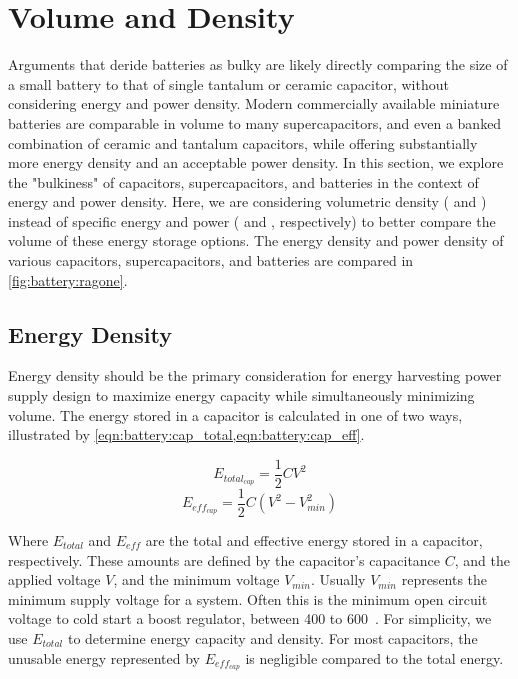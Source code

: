 \section{Volume and Density}
\label{sec:battery:density}
Arguments that deride batteries as bulky are likely directly comparing the size of a small battery to that of single tantalum or ceramic capacitor, without considering energy and power density. Modern commercially available miniature batteries are comparable in volume to many supercapacitors, and even a banked combination of ceramic and tantalum capacitors, while offering substantially more energy density and an acceptable power density. In this section, we explore the "bulkiness" of capacitors, supercapacitors, and batteries in the context of energy and power density. Here, we are considering volumetric density (\ssi[per-mode=symbol]{\Wh\per\liter}  and  \ssi[per-mode=symbol]{\watt\per\liter}) instead of specific energy and power (\ssi[per-mode=symbol]{\Wh\per\kilo\gram} and  \ssi[per-mode=symbol]{\watt\per\kilo\gram}, respectively) to better compare the volume of these energy storage options. The energy density and power density of various capacitors, supercapacitors, and batteries are compared in \cref{fig:battery:ragone}.


\subsection{Energy Density}
Energy density should be the primary consideration for energy harvesting power supply design to maximize energy capacity while simultaneously minimizing volume. 
The energy stored in a capacitor is calculated in one of two ways, illustrated by \cref{eqn:battery:cap_total,eqn:battery:cap_eff}.

\begin{equation}\label{eqn:battery:cap_total}
E_{total_{cap}} = \frac{1}{2} C V^2
\end{equation}
\begin{equation}\label{eqn:battery:cap_eff}
E_{eff_{cap}} = \frac{1}{2} C (V^2 - V_{min}^2)
\end{equation}

\noindent Where $E_{total}$ and $E_{eff}$ are the total and effective energy stored in a capacitor, respectively. These amounts are defined by the capacitor's capacitance $C$, and the applied voltage $V$, and the minimum voltage $V_{min}$. Usually $V_{min}$ represents the minimum supply voltage for a system. 
Often this is the minimum open circuit voltage to cold start a boost regulator, between 400\ssi{\milli\volt} to 600\ssi{\milli\volt}~\cite{adp5091,bq25505,max17222}. 
For simplicity, we use $E_{total}$ to determine energy capacity and density. For most capacitors, the unusable energy represented by $E_{eff_{cap}}$ is negligible compared to the total energy. 

